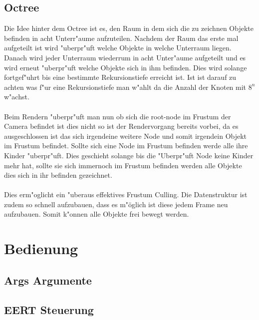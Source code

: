 \documentclass[a4paper,titlepage]{article}
\begin{document}
\subsection{Octree}
Die Idee hinter dem Octree ist es, den Raum in dem sich die zu zeichnen Objekte befinden in acht Unterr"aume aufzuteilen. Nachdem der Raum das erste mal aufgeteilt ist wird "uberpr"uft welche Objekte in welche Unterraum liegen. Danach wird jeder Unterraum wiederrum in acht Unter"aume aufgeteilt und es wird erneut "uberpr"uft welche Objekte sich in ihm befinden. Dies wird solange fortgef"uhrt bis eine bestimmte Rekursionstiefe erreicht ist. Ist ist darauf zu achten was f"ur eine Rekursionstiefe man w"ahlt da die Anzahl der Knoten mit $8^n$ w"achst.\\\\

Beim Rendern "uberpr"uft man nun ob sich die root-node im Frustum der Camera befindet ist dies nicht so ist der Rendervorgang bereits vorbei, da es ausgeschlossen ist das sich irgendeine weitere Node und somit irgendein Objekt im Frustum befindet. Sollte sich eine Node im Frustum befinden werde alle ihre Kinder "uberpr"uft. Dies geschieht solange bis die "Uberpr"uft Node keine Kinder mehr hat, sollte sie sich immernoch im Frustum befinden werden alle Objekte dies sich in ihr befinden gezeichnet.\\\\

Dies erm"oglicht ein "uberaus effektives Frustum Culling. Die Datenstruktur ist zudem so schnell aufzubauen, dass es m"öglich ist diese jedem Frame neu aufzubauen. Somit k"onnen alle Objekte frei bewegt werden.

\section{Bedienung}
\subsection{Args Argumente}
\subsection{EERT Steuerung}
\end{document}
